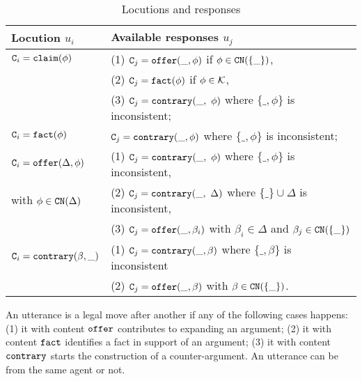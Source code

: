     \begin{table}\vspace{-6mm}
    \centering
        \caption{Locutions and responses}
   \label{tab:legal-moves}
    \begin{tabular}{|l|l|}
    \hline
    Locution $u_i$ &  Available responses $u_j$ \\
    \hline
    $\texttt{\textup{C}}_i = \texttt{\textup{claim}}(\phi)$ & (1) $\texttt{\textup{C}}_j = \texttt{\textup{offer}}(\_ , \phi)$ if $\phi \in \texttt{\textup{CN}}(\{ \_ \})$, \\
                         & (2) $\texttt{\textup{C}}_j =  \texttt{\textup{fact}}(\phi)$ if $\phi \in \mathcal{K}$, \\
                         & (3) $\texttt{\textup{C}}_j =  \texttt{\textup{contrary}}(\_,\ \phi)$ where $\{\_, \phi \}$ is inconsistent; \\
    \hline
    $\texttt{\textup{C}}_i = \texttt{\textup{fact}}(\phi)$ & $\texttt{\textup{C}}_j = \texttt{\textup{contrary}}(\_ , \phi)$ where $\{ \_, \phi \}$ is inconsistent; \\
    \hline
    $\texttt{\textup{C}}_i = \texttt{\textup{offer}}(\Delta, \phi)$ & (1) $\texttt{\textup{C}}_j =  \texttt{\textup{contrary}}(\_,\ \phi)$ where $\{\_, \phi \}$ is inconsistent, \\
     with $\phi \in \texttt{\textup{CN}}(\Delta)$ & (2) $\texttt{\textup{C}}_j =  \texttt{\textup{contrary}}(\_,\ \Delta)$ where $\{\_ \} \cup \Delta$ is inconsistent, \\
                                                         & (3) $\texttt{\textup{C}}_j =  \texttt{\textup{offer}}(\_, \beta_i)$ with $\beta_i \in \Delta$ and $\beta_j \in \texttt{\textup{CN}}(\{\_ \})$ \\
    \hline
    $\texttt{\textup{C}}_i = \texttt{\textup{contrary}}(\beta, \_)$ & (1) $\texttt{\textup{C}}_j =  \texttt{\textup{contrary}}(\_, \beta)$ where $\{ \_, \beta \}$ is inconsistent \\
                              & (2) $\texttt{\textup{C}}_j =  \texttt{\textup{offer}}(\_, \beta)$ with $\beta \in \texttt{\textup{CN}}(\{\_\})$. \\
    \hline
    \end{tabular}
\end{table}
     
An utterance is a legal move after another if any of the following cases happens: (1) it with content $\texttt{\textup{offer}}$ contributes to expanding an argument; (2) it with content $\texttt{\textup{fact}}$ identifies a fact in support of an argument; (3) it with content $\texttt{\textup{contrary}}$ starts the construction of a counter-argument. An utterance can be from the same agent or not. 





